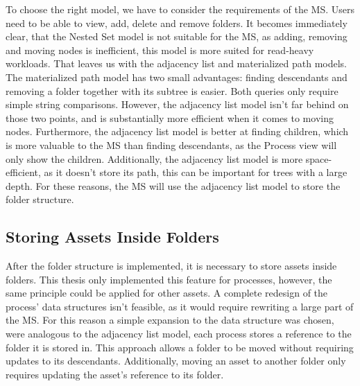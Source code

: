 To choose the right model, we have to consider the requirements of the MS.
Users need to be able to view, add, delete and remove folders.
It becomes immediately clear, that the Nested Set model is not suitable for the MS, as
adding, removing and moving nodes is inefficient, this model is more suited for read-heavy
workloads.
That leaves us with the adjacency list and materialized path models.
%
The materialized path model has two small advantages: finding descendants and removing a
folder together with its subtree is easier.
Both queries only require simple string comparisons.
%
%
However, the adjacency list model isn't far behind on those two points, and is
substantially more efficient when it comes to moving nodes.
Furthermore, the adjacency list model is better at finding children, which is more
valuable to the MS than finding descendants, as the Process view will only show the
children.
Additionally, the adjacency list model is more space-efficient, as it doesn't store its
path, this can be important for trees with a large depth.
For these reasons, the MS will use the adjacency list model to store the folder structure.

\subsection{Storing Assets Inside Folders}

After the folder structure is implemented, it is necessary to store assets inside
folders.
This thesis only implemented this feature for processes, however, the same principle could
be applied for other assets.
A complete redesign of the process' data structures isn't feasible, as it would require
rewriting a large part of the MS.
For this reason a simple expansion to the data structure was chosen, were analogous to
the adjacency list model, each process stores a reference to the folder it is stored in.
This approach allows a folder to be moved without requiring updates to its descendants.
Additionally, moving an asset to another folder only requires updating the asset's
reference to its folder.


